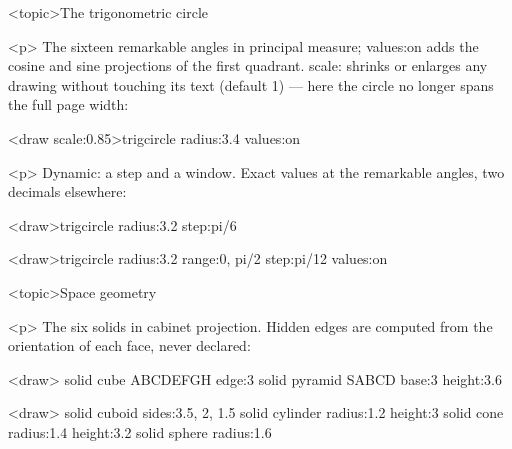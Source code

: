 \documentclass[
  margins=8,
  font=Latin Modern Roman,
  size=12,
  linespread=1.4,
  lang=en
]{scholatex}
\begin{document}
<topic>The trigonometric circle

<p>{ The sixteen remarkable angles in principal measure; values:on adds
the cosine and sine projections of the first quadrant. scale: shrinks or
enlarges any drawing without touching its text (default 1) — here the
circle no longer spans the full page width: }

<draw scale:0.85>trigcircle radius:3.4 values:on

<p>{ Dynamic: a step and a window. Exact values at the remarkable angles,
two decimals elsewhere: }

<draw>trigcircle radius:3.2 step:{pi/6}

<draw>trigcircle radius:3.2 range:{0, pi/2} step:{pi/12} values:on

<topic>Space geometry

<p>{ The six solids in cabinet projection. Hidden edges are computed from
the orientation of each face, never declared: }

<draw>{
	solid cube ABCDEFGH edge:3
	solid pyramid SABCD base:3 height:3.6
}

<draw>{
	solid cuboid sides:{3.5, 2, 1.5}
	solid cylinder radius:1.2 height:3
	solid cone radius:1.4 height:3.2
	solid sphere radius:1.6
}
\end{document}
